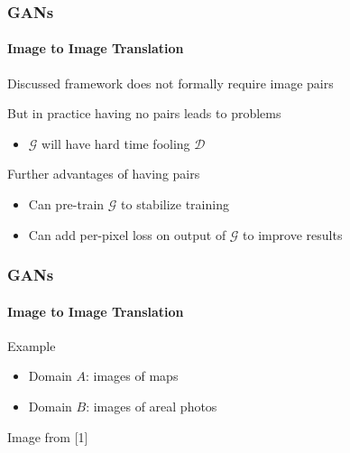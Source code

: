 \documentclass[xetex,professionalfont]{beamer}
\newcommand{\cD}{\mathcal{D}}
\newcommand{\cG}{\mathcal{G}}
\begin{document}
\begin{frame}
	\frametitle{GANs}
	\framesubtitle{Image to Image Translation}

	Discussed framework does not formally require image pairs

	\bigskip

	But in practice having no pairs leads to problems
	\begin{itemize}
		\item $\cG$ will have hard time fooling $\cD$ %
	\end{itemize}

	\bigskip

	Further advantages of having pairs
	\begin{itemize}
		\item Can pre-train $\cG$ to stabilize training %
		\item Can add per-pixel loss on output of $\cG$ to improve results %
	\end{itemize}

\end{frame}


\begin{frame}
	\frametitle{GANs}
	\framesubtitle{Image to Image Translation}

	Example
	\begin{itemize}
		\item Domain $A$: images of maps
		\item Domain $B$: images of areal photos
	\end{itemize}

	\medskip

	\begin{center}
		{\centering Image from [1]}
	\end{center}

\end{frame}
\end{document}
